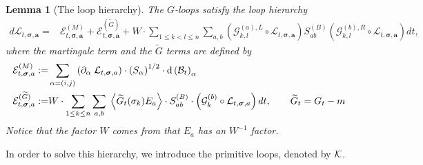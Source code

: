 \documentclass[10pt,reqno]{article}
\theoremstyle{plain} %
\newtheorem{lemma}[theorem]{Lemma}
\theoremstyle{remark}
\numberwithin{equation}{section}
\begin{document}
%

\begin{lemma}[The loop hierarchy] \label{lem:SE_basic}
The $G$-loops satisfy  the loop hierarchy 
\begin{align}\label{eq:mainStoflow}
    d\mathcal{L}_{t, \boldsymbol{\sigma}, \textbf{a}} =& 
    \mathcal{E}^{(M)}_{t, \boldsymbol{\sigma}, \textbf{a}} 
    +
    \mathcal{E}^{(\widetilde{G})}_{t, \boldsymbol{\sigma}, \textbf{a}} 
    +
   W\cdot \sum_{1 \le k < l \le n} \sum_{a, b} \left( \mathcal{G}^{(a), L}_{k, l} \circ \mathcal{L}_{t, \boldsymbol{\sigma}, \textbf{a}} \right) S^{(B)}_{ab} \left( \mathcal{G}^{(b), R}_{k, l} \circ \mathcal{L}_{t, \boldsymbol{\sigma}, \textbf{a}} \right) dt, 
\end{align}
 where the martingale term and the $\widetilde{G}$ terms are defined by 
 \begin{align} \label{def_Edif}
\mathcal{E}^{(M)}_{t, \boldsymbol{\sigma}, \textbf{a}} :  = & \sum_{\alpha=(i,j)} 
  \left( \partial_{  \alpha} \; {\cal L}_{t, \boldsymbol{\sigma}, \textbf{a}}  \right)
 \cdot \left(S _\alpha\right)^{1/2} \cdot
  \mathrm{d} \left({\cal B}_t\right)_{\alpha} \\\label{def_EwtG}
  \mathcal{E}^{(\widetilde{G})}_{t, \boldsymbol{\sigma}, \textbf{a}}: = &   {W}\cdot \sum_{1 \le k \le n} \sum_{a, b} \; 
 \left \langle \widetilde{G}_t(\sigma_k) E_a \right\rangle
  \cdot S^{(B)}_{ab} \cdot
  \left( {\cal G}^{(b)}_{k} \circ {\cal L}_{t, \boldsymbol{\sigma}, \textbf{a}} \right) dt ,\quad \quad \widetilde{G}_t = G_t - m
\end{align}
Notice that the factor $W$ comes from that $E_a$ has an $W^{-1}$ factor.

  \end{lemma}
  
  
 
In order to solve this hierarchy, we introduce the primitive loops, denoted by $\cal K$. 
\end{document}
